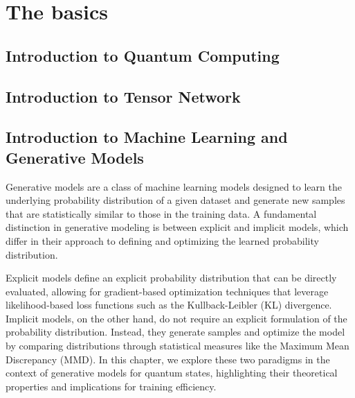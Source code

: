\chapter{The basics}

\section{Introduction to Quantum Computing}

\lipsum[1-2] 
\cite{rudolph_generation_2022}
\cite{schollwock_density-matrix_2011}
\cite{mangini_low-variance_2024}
\cite{rudolph_trainability_2024}
\cite{garcia-perez_learning_2021}

\section{Introduction to Tensor Network}

\lipsum[1-2]

\section{Introduction to Machine Learning and Generative Models}

Generative models are a class of machine learning models designed to learn the underlying probability distribution of a given dataset and generate new samples that are statistically similar to those in the training data. A fundamental distinction in generative modeling is between explicit and implicit models, which differ in their approach to defining and optimizing the learned probability distribution.

Explicit models define an explicit probability distribution that can be directly evaluated, allowing for gradient-based optimization techniques that leverage likelihood-based loss functions such as the Kullback-Leibler (KL) divergence. Implicit models, on the other hand, do not require an explicit formulation of the probability distribution. Instead, they generate samples and optimize the model by comparing distributions through statistical measures like the Maximum Mean Discrepancy (MMD). In this chapter, we explore these two paradigms in the context of generative models for quantum states, highlighting their theoretical properties and implications for training efficiency.
